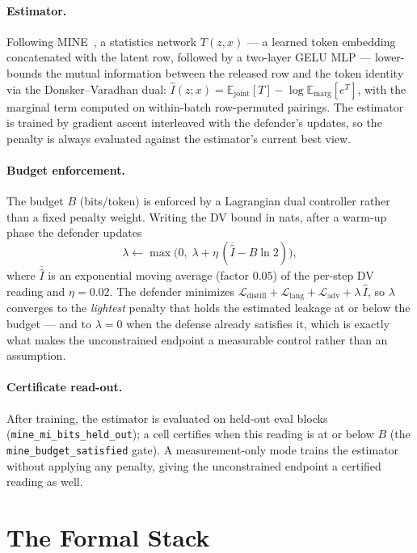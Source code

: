 \documentclass[10pt]{article}
\newcommand{\Ihat}{\hat{I}}
\begin{document}
\paragraph{Estimator.}
Following MINE~\cite{mine}, a statistics network $T(z, x)$ — a learned
token embedding concatenated with the latent row, followed by a two-layer
GELU MLP — lower-bounds the mutual information between the released row
and the token identity via the Donsker--Varadhan dual:
$\Ihat(z;x) = \mathbb{E}_{\text{joint}}[T] - \log
\mathbb{E}_{\text{marg}}[e^{T}]$, with the marginal term computed on
within-batch row-permuted pairings.  The estimator is trained by gradient
ascent interleaved with the defender's updates, so the penalty is always
evaluated against the estimator's current best view.

\paragraph{Budget enforcement.}
The budget $B$ (bits/token) is enforced by a Lagrangian dual controller
rather than a fixed penalty weight.  Writing the DV bound in nats, after a
warm-up phase the defender updates
\begin{equation}
\lambda \leftarrow \max\!\bigl(0,\; \lambda + \eta\,(\overline{\Ihat} - B\ln 2)\bigr),
\end{equation}
where $\overline{\Ihat}$ is an exponential moving average (factor $0.05$)
of the per-step DV reading and $\eta = 0.02$.  The defender minimizes
$\mathcal{L}_{\text{distill}} + \mathcal{L}_{\text{lang}} +
\mathcal{L}_{\text{adv}} + \lambda\,\Ihat$,
so $\lambda$ converges to the \emph{lightest} penalty that holds the
estimated leakage at or below the budget — and to $\lambda{=}0$ when the
defense already satisfies it, which is exactly what makes the
unconstrained endpoint a measurable control rather than an assumption.

\paragraph{Certificate read-out.}
After training, the estimator is evaluated on held-out eval blocks
(\texttt{mine\_\allowbreak mi\_\allowbreak bits\_\allowbreak held\_\allowbreak out}); a cell certifies when this reading
is at or below $B$ (the \texttt{mine\_budget\_satisfied} gate).  A
measurement-only mode trains the estimator without applying any penalty,
giving the unconstrained endpoint a certified reading as well.

\section{The Formal Stack}
\label{sec:formal}
\end{document}

